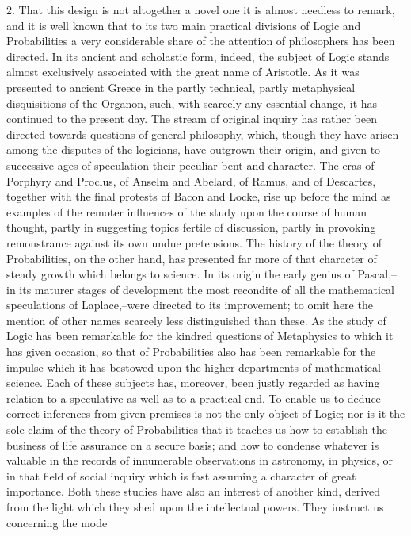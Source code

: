 \documentclass[oneside]{book}
\begin{document}
2. That this design is not altogether a novel one it is almost
needless to remark, and it is well known that to its two main
practical divisions of Logic and Probabilities a very considerable
share of the attention of philosophers has been directed. In its
ancient and scholastic form, indeed, the subject of Logic stands
almost exclusively associated with the great name of Aristotle.
As it was presented to ancient Greece in the partly technical,
partly metaphysical disquisitions of the Organon, such, with
scarcely any essential change, it has continued to the present
day. The stream of original inquiry has rather been directed
towards questions of general philosophy, which, though they
have arisen among the disputes of the logicians, have outgrown
their origin, and given to successive ages of speculation their peculiar
bent and character. The eras of Porphyry and Proclus,
of Anselm and Abelard, of Ramus, and of Descartes, together
with the final protests of Bacon and Locke, rise up before the
mind as examples of the remoter influences of the study upon the
course of human thought, partly in suggesting topics fertile of
discussion, partly in provoking remonstrance against its own undue
pretensions. The history of the theory of Probabilities, on
the other hand, has presented far more of that character of steady
growth which belongs to science. In its origin the early genius
of Pascal,--in its maturer stages of development the most recondite
of all the mathematical speculations of Laplace,--were directed
to its improvement; to omit here the mention of other names
scarcely less distinguished than these. As the study of Logic has
been remarkable for the kindred questions of Metaphysics to
which it has given occasion, so that of Probabilities also has been
remarkable for the impulse which it has bestowed upon the
higher departments of mathematical science. Each of these subjects
has, moreover, been justly regarded as having relation to a
speculative as well as to a practical end. To enable us to deduce
correct inferences from given premises is not the only object of
Logic; nor is it the sole claim of the theory of Probabilities that
it teaches us how to establish the business of life assurance on a
secure basis; and how to condense whatever is valuable in the
records of innumerable observations in astronomy, in physics, or
in that field of social inquiry which is fast assuming a character
of great importance. Both these studies have also an interest
of another kind, derived from the light which they shed upon
the intellectual powers. They instruct us concerning the mode
\end{document}
